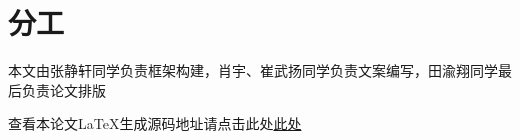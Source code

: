 \documentclass{article}
\begin{document}
\printbibliography
\section{分工}
本文由张静轩同学负责框架构建，肖宇、崔武扬同学负责文案编写，田渝翔同学最后负责论文排版

查看本论文LaTeX生成源码地址请点击此处\href{https://github.com/Fully-ripe-mango/Mycode/new/main}{此处}
\end{document}
